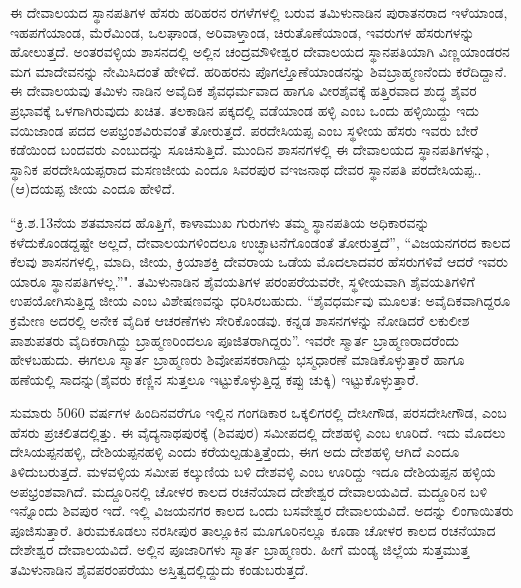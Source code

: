 ಈ ದೇವಾಲಯದ ಸ್ಥಾನಪತಿಗಳ ಹೆಸರು ಹರಿಹರನ ರಗಳೆಗಳಲ್ಲಿ ಬರುವ ತಮಿಳುನಾಡಿನ ಪುರಾತನರಾದ ಇಳೆಯಾಂಡ, ಇಹಪಗೆಯಾಂಡ, ಮೆರೆಮಿಂಡ, ಒಲಘಾಂಡ, ಅರಿವಾಳ್ತಾಂಡ, ಚಿರುತೊಣೆಯಾಂಡ, ಇವರುಗಳ ಹೆಸರುಗಳನ್ನು ಹೋಲುತ್ತದೆ. ಅಂತರವಳ್ಳಿಯ ಶಾಸನದಲ್ಲಿ ಅಲ್ಲಿನ ಚಂದ್ರಮೌಳೀಶ್ವರ ದೇವಾಲಯದ ಸ್ಥಾನಪತಿಯಾಗಿ ವಿಣ್ಣಯಾಂಡರನ ಮಗ ಮಾದೇವನನ್ನು ನೇಮಿಸಿದಂತೆ ಹೇಳಿದೆ. ಹರಿಹರನು ಪೊಗಲ್ತೊಣೆಯಾಂಡನನ್ನು ಶಿವಬ್ರಾಹ್ಮಣನೆಂದು ಕರೆದಿದ್ದಾನೆ. ಈ ದೇವಾಲಯವು ತಮಿಳು ನಾಡಿನ ಅವೈದಿಕ ಶೈವಧರ್ಮವಾದ ಹಾಗೂ ವೀರಶೈವಕ್ಕೆ ಹತ್ತಿರವಾದ ಶುದ್ಧ ಶೈವರ ಪ್ರಭಾವಕ್ಕೆ ಒಳಗಾಗಿರುವುದು ಖಚಿತ. ತಲಕಾಡಿನ ಪಕ್ಕದಲ್ಲಿ ವಡೆಯಾಂಡ ಹಳ್ಳಿ ಎಂಬ ಒಂದು ಹಳ್ಳಿಯಿದ್ದು ಇದು ವಯಿಜಾಂಡ ಪದದ ಅಪಭ್ರಂಶವಿರುವಂತೆ ತೋರುತ್ತದೆ. ಪರದೇಸಿಯಪ್ಪ ಎಂಬ ಸ್ಥಳೀಯ ಹೆಸರು ಇವರು ಬೇರೆ ಕಡೆಯಿಂದ ಬಂದವರು ಎಂಬುದನ್ನು ಸೂಚಿಸುತ್ತಿದೆ. ಮುಂದಿನ ಶಾಸನಗಳಲ್ಲಿ ಈ ದೇವಾಲಯದ ಸ್ಥಾನಪತಿಗಳನ್ನು, ಸ್ಥಾನಿಕ ಪರದೇಸಿಯಪ್ಪರಾದ ಮಸಣಜೀಯ ಎಂದೂ ಸಿವರಪುರ ವಇಜನಾಥ ದೇವರ ಸ್ಥಾನಪತಿ ಪರದೇಸಿಯಪ್ಪ.. (ಆ)ದಯಪ್ಪ ಜೀಯ ಎಂದೂ ಹೇಳಿದೆ.

“ಕ್ರಿ.ಶ.13ನೆಯ ಶತಮಾನದ ಹೊತ್ತಿಗೆ, ಕಾಳಾಮುಖ ಗುರುಗಳು ತಮ್ಮ ಸ್ಥಾನಪತಿಯ ಅಧಿಕಾರವನ್ನು ಕಳೆದುಕೊಂಡದ್ದಷ್ಟೇ ಅಲ್ಲದೆ, ದೇವಾಲಯಗಳಿಂದಲೂ ಉಚ್ಛಾಟನೆಗೊಂಡಂತೆ ತೋರುತ್ತದೆ”, “ವಿಜಯನಗರದ ಕಾಲದ ಕೆಲವು ಶಾಸನಗಳಲ್ಲಿ, ಮಾದಿ, ಜೀಯ, ಕ್ರಿಯಾಶಕ್ತಿ ದೇವರಾಯ ಒಡೆಯ ಮೊದಲಾದವರ ಹೆಸರುಗಳಿವೆ ಆದರೆ ಇವರು ಯಾರೂ ಸ್ಥಾನಪತಿಗಳಲ್ಲ.”". ತಮಿಳುನಾಡಿನ ಶೈವಯತಿಗಳ ಪರಂಪರೆಯವರೇ, ಸ್ಥಳೀಯವಾಗಿ ಶೈವಯತಿಗಳಿಗೆ ಉಪಯೋಗಿಸುತ್ತಿದ್ದ ಜೀಯ ಎಂಬ ವಿಶೇಷಣವನ್ನು ಧರಿಸಿರಬಹುದು. “ಶೈವಧರ್ಮವು ಮೂಲತ: ಅವೈದಿಕವಾಗಿದ್ದರೂ ಕ್ರಮೇಣ ಅದರಲ್ಲಿ ಅನೇಕ ವೈದಿಕ ಆಚರಣೆಗಳು ಸೇರಿಕೊಂಡವು. ಕನ್ನಡ ಶಾಸನಗಳನ್ನು ನೋಡಿದರೆ ಲಕುಲೀಶ ಪಾಶುಪತರು ವೈದಿಕರಾಗಿದ್ದು ಬ್ರಾಹ್ಮಣರಿಂದಲೂ ಪೂಜಿತರಾಗಿದ್ದರು”. ಇವರೇ ಸ್ಮಾರ್ತ ಬ್ರಾಹ್ಮಣರಾದರೆಂದು ಹೇಳಬಹುದು. ಈಗಲೂ ಸ್ಮಾರ್ತ ಬ್ರಾಹ್ಮಣರು ಶಿವೋಪಸಕರಾಗಿದ್ದು ಭಸ್ಮಧಾರಣೆ ಮಾಡಿಕೊಳ್ಳುತ್ತಾರೆ ಹಾಗೂ ಹಣೆಯಲ್ಲಿ ಸಾದನ್ನು(ಶೈವರು ಕಣ್ಣಿನ ಸುತ್ತಲೂ ಇಟ್ಟುಕೊಳ್ಳುತ್ತಿದ್ದ ಕಪ್ಪು ಚುಕ್ಕಿ) ಇಟ್ಟುಕೊಳ್ಳುತ್ತಾರೆ.

ಸುಮಾರು 5060 ವರ್ಷಗಳ ಹಿಂದಿನವರೆಗೂ ಇಲ್ಲಿನ ಗಂಗಡಿಕಾರ ಒಕ್ಕಲಿಗರಲ್ಲಿ ದೇಸೀಗೌಡ, ಪರಸದೇಸೀಗೌಡ, ಎಂಬ ಹೆಸರು ಪ್ರಚಲಿತದಲ್ಲಿತ್ತು. ಈ ವೈದ್ಯನಾಥಪುರಕ್ಕೆ (ಶಿವಪುರ) ಸಮೀಪದಲ್ಲಿ ದೇಶಹಳ್ಳಿ ಎಂಬ ಊರಿದೆ. ಇದು ಮೊದಲು ದೇಸಿಯಪ್ಪನಹಳ್ಳಿ, ದೇಶಿಯಪ್ಪನಹಳ್ಳಿ ಎಂದು ಕರೆಯಲ್ಪಡುತ್ತಿತ್ತೆಂದು, ಈಗ ಅದು ದೇಶಹಳ್ಳಿ ಆಗಿದೆ ಎಂದೂ ತಿಳಿದುಬರುತ್ತದೆ. ಮಳವಳ್ಳಿಯ ಸಮೀಪ ಕಲ್ಕುಣಿಯ ಬಳಿ ದೇಶವಳ್ಳಿ ಎಂಬ ಊರಿದ್ದು ಇದೂ ದೇಶಿಯಪ್ಪನ ಹಳ್ಳಿಯ ಅಪಭ್ರಂಶವಾಗಿದೆ. ಮದ್ದೂರಿನಲ್ಲಿ ಚೋಳರ ಕಾಲದ ರಚನೆಯಾದ ದೇಶೇಶ್ವರ ದೇವಾಲಯವಿದೆ. ಮದ್ದೂರಿನ ಬಳಿ ಇನ್ನೊಂದು ಶಿವಪುರ ಇದೆ. ಇಲ್ಲಿ ವಿಜಯನಗರ ಕಾಲದ ಒಂದು ಬಸವೇಶ್ವರ ದೇವಾಲಯವಿದೆ. ಅದನ್ನು ಲಿಂಗಾಯಿತರು ಪೂಜಿಸುತ್ತಾರೆ. ತಿರುಮಕೂಡಲು ನರಸೀಪುರ ತಾಲ್ಲೂಕಿನ ಮೂಗೂರಿನಲ್ಲೂ ಕೂಡಾ ಚೋಳರ ಕಾಲದ ರಚನೆಯಾದ ದೇಶೇಶ್ವರ ದೇವಾಲಯವಿದೆ. ಅಲ್ಲಿನ ಪೂಜಾರಿಗಳು ಸ್ಮಾರ್ತ ಬ್ರಾಹ್ಮಣರು. ಹೀಗೆ ಮಂಡ್ಯ ಜಿಲ್ಲೆಯ ಸುತ್ತಮುತ್ತ ತಮಿಳುನಾಡಿನ ಶೈವಪರಂಪರೆಯು ಅಸ್ತಿತ್ವದಲ್ಲಿದ್ದುದು ಕಂಡುಬರುತ್ತದೆ.

